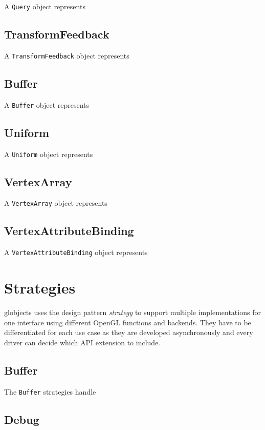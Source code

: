 \documentclass{article}
\begin{document}
A \verb|Query| object represents 

\subsection{TransformFeedback}

A \verb|TransformFeedback| object represents 

\subsection{Buffer}

A \verb|Buffer| object represents 

\subsection{Uniform}

A \verb|Uniform| object represents 

\subsection{VertexArray}

A \verb|VertexArray| object represents 

\subsection{VertexAttributeBinding}

A \verb|VertexAttributeBinding| object represents 

\section{Strategies}

globjects uses the design pattern \emph{strategy} to support multiple implementations for one interface using different OpenGL functions and backends. They have to be differentiated for each use case as they are developed asynchronously and every driver can decide which API extension to include.

\subsection{Buffer}

The \verb|Buffer| strategies handle

\subsection{Debug}
\end{document}
